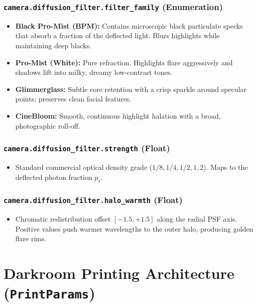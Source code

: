 \documentclass[11pt,a4paper]{article}
\begin{document}
\subsubsection{\texttt{camera.diffusion\_filter.filter\_family} (Enumeration)}
\begin{itemize}[leftmargin=*]
    \item \textbf{Black Pro-Mist (BPM):} Contains microscopic black particulate specks that absorb a fraction of the deflected light. Blurs highlights while maintaining deep blacks.
    \item \textbf{Pro-Mist (White):} Pure refraction. Highlights flare aggressively and shadows lift into milky, dreamy low-contrast tones.
    \item \textbf{Glimmerglass:} Subtle core retention with a crisp sparkle around specular points; preserves clean facial features.
    \item \textbf{CineBloom:} Smooth, continuous highlight halation with a broad, photographic roll-off.
\end{itemize}

\subsubsection{\texttt{camera.diffusion\_filter.strength} (Float)}
\begin{itemize}[leftmargin=*]
    \item Standard commercial optical density grade ($1/8, 1/4, 1/2, 1, 2$). Maps to the deflected photon fraction $p_s$.
\end{itemize}

\subsubsection{\texttt{camera.diffusion\_filter.halo\_warmth} (Float)}
\begin{itemize}[leftmargin=*]
    \item Chromatic redistribution offset $[-1.5, +1.5]$ along the radial PSF axis. Positive values push warmer wavelengths to the outer halo, producing golden flare rims.
\end{itemize}

\newpage

\section{Darkroom Printing Architecture (\texttt{PrintParams})}
\end{document}
